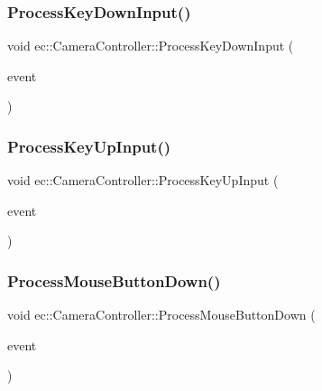 \subsubsection{\texorpdfstring{Process\+Key\+Down\+Input()}{ProcessKeyDownInput()}}
{\footnotesize\ttfamily void ec\+::\+Camera\+Controller\+::\+Process\+Key\+Down\+Input (\begin{DoxyParamCaption}\item[{const \mbox{\hyperlink{structec_1_1_key_event}{Key\+Event}} \&}]{event }\end{DoxyParamCaption})\hspace{0.3cm}{\ttfamily [protected]}}

\mbox{\label{classec_1_1_camera_controller_af205398ddb5e79bd64302e676ced3051}} 
\subsubsection{\texorpdfstring{Process\+Key\+Up\+Input()}{ProcessKeyUpInput()}}
{\footnotesize\ttfamily void ec\+::\+Camera\+Controller\+::\+Process\+Key\+Up\+Input (\begin{DoxyParamCaption}\item[{const \mbox{\hyperlink{structec_1_1_key_event}{Key\+Event}} \&}]{event }\end{DoxyParamCaption})\hspace{0.3cm}{\ttfamily [protected]}}

\mbox{\label{classec_1_1_camera_controller_ac96fb273f1f776558ec24a8cbdb2e476}} 
\subsubsection{\texorpdfstring{Process\+Mouse\+Button\+Down()}{ProcessMouseButtonDown()}}
{\footnotesize\ttfamily void ec\+::\+Camera\+Controller\+::\+Process\+Mouse\+Button\+Down (\begin{DoxyParamCaption}\item[{const \mbox{\hyperlink{structec_1_1_mouse_button_event}{Mouse\+Button\+Event}} \&}]{event }\end{DoxyParamCaption})\hspace{0.3cm}{\ttfamily [protected]}}

